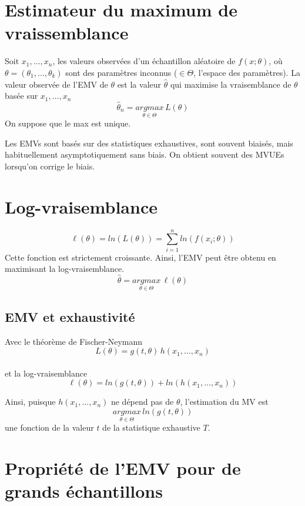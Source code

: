 \section{Estimateur du maximum de vraissemblance}\label{estimateur-du-maximum-de-vraissemblance}

Soit \(x_1,\dots,x_n\), les valeurs observées d'un échantillon aléatoire
de \(f(x;\theta)\), où \(\theta=(\theta_1,\dots,\theta_k)\) sont des
paramètres inconnus (\(\in \Theta\), l'espace des paramètres). La valeur
observée de l'EMV de \(\theta\) est la valeur \(\hat{\theta}\) qui
maximise la vraisemblance de \(\theta\) basée sur \(x_1,\dots,x_n\) \[
\hat{\theta}_n=\underset{\theta\in\Theta}{argmax}\,L(\theta)
\] On suppose que le max est unique.

Les EMVs sont basés sur des statistiques exhaustives, sont souvent
biaisés, mais habituellement asymptotiquement sans biais. On obtient
souvent des MVUEs lorsqu'on corrige le biais.

\section{Log-vraisemblance}\label{log-vraisemblance}

\[
\ell(\theta)=ln\left (L(\theta)\right )=\sum^n_{i=1} ln\left (f(x_i;\theta)\right )
\] Cette fonction est strictement croissante. Ainsi, l'EMV peut être
obtenu en maximisant la log-vraisemblance. \[
\hat{\theta}=\underset{\theta\in\Theta}{argmax}\,\ell(\theta)
\]

\subsection{EMV et exhaustivité}\label{emv-et-exhaustivite}

Avec le théorème de Fischer-Neymann \[
L(\theta)=g(t,\theta)\,h(x_1,\dots,x_n)
\]\\
et la log-vraisemblance \[
\ell(\theta)=ln(g(t,\theta))+ln(h(x_1,\dots,x_n))
\]

Ainsi, puisque \(h(x_1,\dots,x_n)\) ne dépend pas de \(\theta\),
l'estimation du MV est \[
\underset{\theta\in\Theta}{argmax}\, ln(g(t,\theta))
\] une fonction de la valeur \(t\) de la statistique exhaustive \(T\).

\section{Propriété de l'EMV pour de grands échantillons}\label{propriete-de-lemv-pour-de-grands-echantillons}

